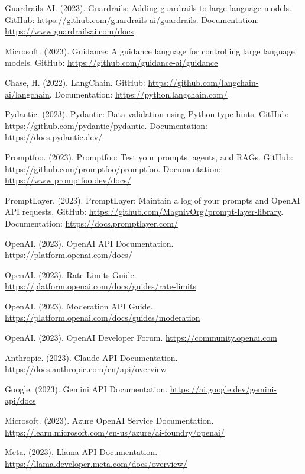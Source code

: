 \documentclass[11pt]{article}
\begin{document}
\begin{thebibliography}{99}
Guardrails AI. (2023). Guardrails: Adding guardrails to large language models. GitHub: \url{https://github.com/guardrails-ai/guardrails}. Documentation: \url{https://www.guardrailsai.com/docs}

Microsoft. (2023). Guidance: A guidance language for controlling large language models. GitHub: \url{https://github.com/guidance-ai/guidance}

Chase, H. (2022). LangChain. GitHub: \url{https://github.com/langchain-ai/langchain}. Documentation: \url{https://python.langchain.com/}

Pydantic. (2023). Pydantic: Data validation using Python type hints. GitHub: \url{https://github.com/pydantic/pydantic}. Documentation: \url{https://docs.pydantic.dev/}

Promptfoo. (2023). Promptfoo: Test your prompts, agents, and RAGs. GitHub: \url{https://github.com/promptfoo/promptfoo}. Documentation: \url{https://www.promptfoo.dev/docs/}

PromptLayer. (2023). PromptLayer: Maintain a log of your prompts and OpenAI API requests. GitHub: \url{https://github.com/MagnivOrg/prompt-layer-library}. Documentation: \url{https://docs.promptlayer.com/}

OpenAI. (2023). OpenAI API Documentation. \url{https://platform.openai.com/docs/}

OpenAI. (2023). Rate Limits Guide. \url{https://platform.openai.com/docs/guides/rate-limits}

OpenAI. (2023). Moderation API Guide. \url{https://platform.openai.com/docs/guides/moderation}

OpenAI. (2023). OpenAI Developer Forum. \url{https://community.openai.com}

Anthropic. (2023). Claude API Documentation. \url{https://docs.anthropic.com/en/api/overview}

Google. (2023). Gemini API Documentation. \url{https://ai.google.dev/gemini-api/docs}

Microsoft. (2023). Azure OpenAI Service Documentation. \url{https://learn.microsoft.com/en-us/azure/ai-foundry/openai/}

Meta. (2023). Llama API Documentation. \url{https://llama.developer.meta.com/docs/overview/}


\end{thebibliography}
\end{document}
